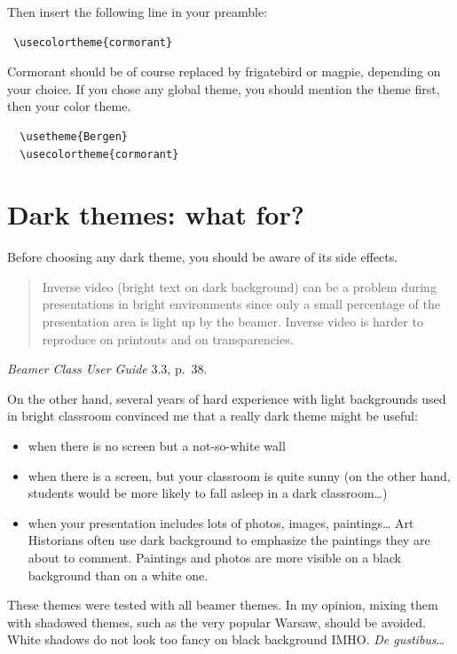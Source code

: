 \documentclass[12pt]{article}
\begin{document}
Then insert the following line in your preamble:
\begin{verbatim}
 \usecolortheme{cormorant}
\end{verbatim}

Cormorant should be of course replaced by \ttfamily frigatebird \rmfamily or \ttfamily{}magpie\rmfamily{}, depending on your choice.
If you chose any global theme, you should mention the theme first, then your color theme.

\begin{verbatim}
  \usetheme{Bergen}
  \usecolortheme{cormorant}
\end{verbatim}

\section{Dark themes: what for?}

Before choosing any dark theme, you should be aware of its side effects.

\begin{quotation}
        Inverse video (bright text on dark background) can be a problem during presentations in bright environments since only a small percentage of the presentation area is light up by the beamer. Inverse video is harder to reproduce on printouts and on transparencies.
\end{quotation}

\begin{flushright}
  \emph{Beamer Class User Guide} 3.3, p.~38. 
\end{flushright}

On the other hand, several years of hard experience with light backgrounds used in bright classroom convinced me that a really dark theme might be useful: 
\begin{itemize}
    \item when there is no screen but a not-so-white wall 
    \item when there is a screen, but your classroom is quite sunny (on the other hand, students would be more likely to fall asleep in a dark classroom…) 
    \item when your presentation includes lots of photos, images, paintings… Art Historians often use dark background to emphasize the paintings they are about to comment. Paintings and photos are more visible on a black background than on a white one.
\end{itemize}

These themes were tested with all beamer themes. In my opinion, mixing them with shadowed themes, such as the very popular Warsaw, should be avoided. White shadows do not look too fancy on black background IMHO. \emph{De gustibus}…
\end{document}
